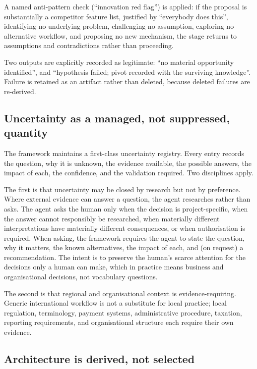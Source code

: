 \documentclass[11pt,a4paper]{article}
\begin{document}
A named anti-pattern check (``innovation red flag'') is applied: if the proposal is substantially a competitor feature list, justified by ``everybody does this'', identifying no underlying problem, challenging no assumption, exploring no alternative workflow, and proposing no new mechanism, the stage returns to assumptions and contradictions rather than proceeding.

Two outputs are explicitly recorded as legitimate: ``no material opportunity identified'', and ``hypothesis failed; pivot recorded with the surviving knowledge''. Failure is retained as an artifact rather than deleted, because deleted failures are re-derived.

\subsection{Uncertainty as a managed, not suppressed, quantity}

The framework maintains a first-class uncertainty registry. Every entry records the question, why it is unknown, the evidence available, the possible answers, the impact of each, the confidence, and the validation required. Two disciplines apply.

The first is that uncertainty may be closed by research but not by preference. Where external evidence can answer a question, the agent researches rather than asks. The agent asks the human only when the decision is project-specific, when the answer cannot responsibly be researched, when materially different interpretations have materially different consequences, or when authorisation is required. When asking, the framework requires the agent to state the question, why it matters, the known alternatives, the impact of each, and (on request) a recommendation. The intent is to preserve the human's scarce attention for the decisions only a human can make, which in practice means business and organisational decisions, not vocabulary questions.

The second is that regional and organisational context is evidence-requiring. Generic international workflow is not a substitute for local practice; local regulation, terminology, payment systems, administrative procedure, taxation, reporting requirements, and organisational structure each require their own evidence.

\subsection{Architecture is derived, not selected}
\end{document}
